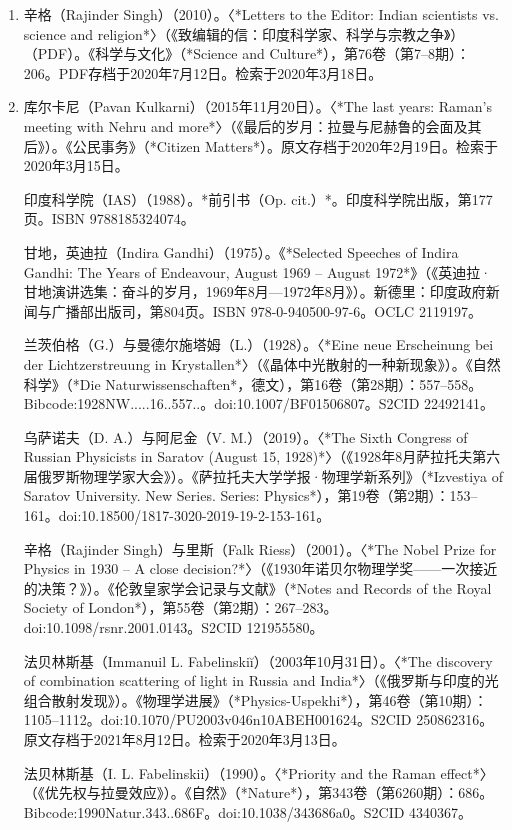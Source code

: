 \begin{enumerate}
\item 辛格（Rajinder Singh）（2010）。〈*Letters to the Editor: Indian scientists vs. science and religion*〉（《致编辑的信：印度科学家、科学与宗教之争》）（PDF）。《科学与文化》（*Science and Culture*），第76卷（第7–8期）：206。PDF存档于2020年7月12日。检索于2020年3月18日。

\item 库尔卡尼（Pavan Kulkarni）（2015年11月20日）。〈*The last years: Raman's meeting with Nehru and more*〉（《最后的岁月：拉曼与尼赫鲁的会面及其后》）。《公民事务》（*Citizen Matters*）。原文存档于2020年2月19日。检索于2020年3月15日。

印度科学院（IAS）（1988）。*前引书（Op. cit.）*。印度科学院出版，第177页。ISBN 9788185324074。

甘地，英迪拉（Indira Gandhi）（1975）。《*Selected Speeches of Indira Gandhi: The Years of Endeavour, August 1969 – August 1972*》（《英迪拉·甘地演讲选集：奋斗的岁月，1969年8月—1972年8月》）。新德里：印度政府新闻与广播部出版司，第804页。ISBN 978-0-940500-97-6。OCLC 2119197。

兰茨伯格（G.）与曼德尔施塔姆（L.）（1928）。〈*Eine neue Erscheinung bei der Lichtzerstreuung in Krystallen*〉（《晶体中光散射的一种新现象》）。《自然科学》（*Die Naturwissenschaften*，德文），第16卷（第28期）：557–558。Bibcode:1928NW.....16..557..。doi:10.1007/BF01506807。S2CID 22492141。

乌萨诺夫（D. A.）与阿尼金（V. M.）（2019）。〈*The Sixth Congress of Russian Physicists in Saratov (August 15, 1928)*〉（《1928年8月萨拉托夫第六届俄罗斯物理学家大会》）。《萨拉托夫大学学报·物理学新系列》（*Izvestiya of Saratov University. New Series. Series: Physics*），第19卷（第2期）：153–161。doi:10.18500/1817-3020-2019-19-2-153-161。

辛格（Rajinder Singh）与里斯（Falk Riess）（2001）。〈*The Nobel Prize for Physics in 1930 – A close decision?*〉（《1930年诺贝尔物理学奖——一次接近的决策？》）。《伦敦皇家学会记录与文献》（*Notes and Records of the Royal Society of London*），第55卷（第2期）：267–283。doi:10.1098/rsnr.2001.0143。S2CID 121955580。

法贝林斯基（Immanuil L. Fabelinskiĭ）（2003年10月31日）。〈*The discovery of combination scattering of light in Russia and India*〉（《俄罗斯与印度的光组合散射发现》）。《物理学进展》（*Physics-Uspekhi*），第46卷（第10期）：1105–1112。doi:10.1070/PU2003v046n10ABEH001624。S2CID 250862316。原文存档于2021年8月12日。检索于2020年3月13日。

法贝林斯基（I. L. Fabelinskii）（1990）。〈*Priority and the Raman effect*〉（《优先权与拉曼效应》）。《自然》（*Nature*），第343卷（第6260期）：686。Bibcode:1990Natur.343..686F。doi:10.1038/343686a0。S2CID 4340367。


\end{enumerate}
